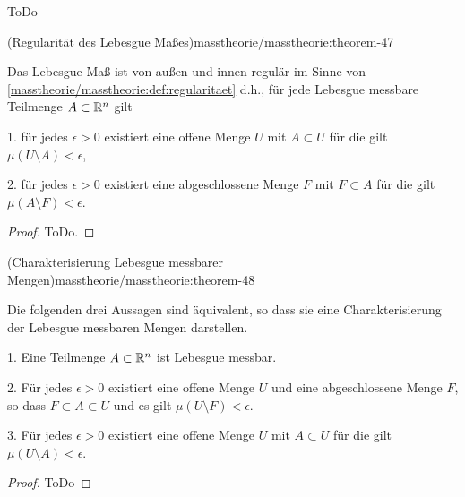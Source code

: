 \begin{emphBox}{}{}
\par
ToDo
\end{emphBox}
\begin{theorem}{(Regularität des Lebesgue Maßes)}{masstheorie/masstheorie:theorem-47}



\par
Das Lebesgue Maß ist von außen und innen regulär im Sinne von \cref{masstheorie/masstheorie:def:regularitaet}  d.h., für jede Lebesgue messbare Teilmenge \(A \subset \mathbb{R}^n\) gilt

\par
1. für jedes \(\epsilon > 0\) existiert eine offene Menge \(U\) mit \(A \subset U\) für die gilt \(\mu(U \setminus A) < \epsilon\),

\par
2. für jedes \(\epsilon > 0\) existiert eine abgeschlossene Menge \(F\) mit \(F \subset A\) für die gilt \(\mu(A \setminus F) < \epsilon\).
\end{theorem}

\begin{proof}
 ToDo.
\end{proof}
\begin{theorem}{(Charakterisierung Lebesgue messbarer Mengen)}{masstheorie/masstheorie:theorem-48}



\par
Die folgenden drei Aussagen sind äquivalent, so dass sie eine Charakterisierung der Lebesgue messbaren Mengen darstellen.

\par
1. Eine Teilmenge \(A \subset \mathbb{R}^n\) ist Lebesgue messbar.

\par
2. Für jedes \(\epsilon > 0\) existiert eine offene Menge \(U\) und eine abgeschlossene Menge \(F\), so dass \(F \subset A \subset U\) und es gilt \(\mu(U \setminus F) < \epsilon\).

\par
3. Für jedes \(\epsilon > 0\) existiert eine offene Menge \(U\) mit \(A \subset U\) für die gilt \(\mu(U \setminus A) < \epsilon\).
\end{theorem}

\begin{proof}
 ToDo
\end{proof}

